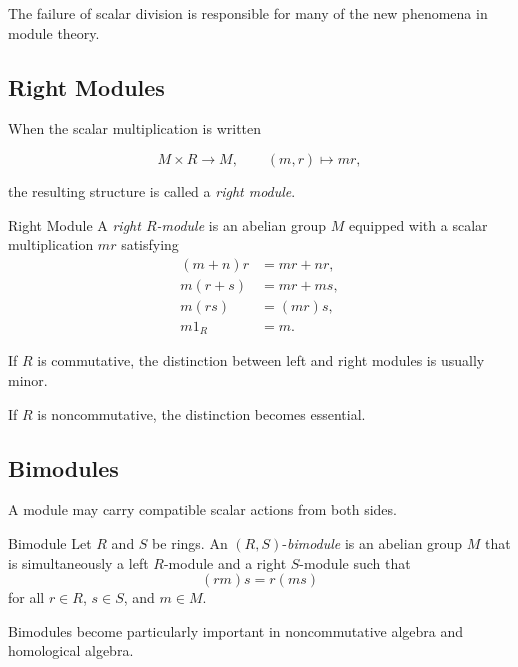 The failure of scalar division is responsible for many of the new phenomena
in module theory.

\subsection{Right Modules}
\label{subsec:right-modules}

When the scalar multiplication is written

\[ M\times R\to M,\qquad(m,r)\mapsto mr, \]

the resulting structure is called a \emph{right module}.

\begin{definitionbox}{Right Module}
A \emph{right \(R\)-module} is an abelian group \(M\) equipped with a scalar
multiplication \(mr\) satisfying
\[
\begin{aligned}
(m+n)r&=mr+nr,\\
m(r+s)&=mr+ms,\\
m(rs)&=(mr)s,\\
m1_R&=m.
\end{aligned}
\]
\end{definitionbox}

If \(R\) is commutative, the distinction between left and right modules is
usually minor.

If \(R\) is noncommutative, the distinction becomes essential.

\subsection{Bimodules}
\label{subsec:bimodules}

A module may carry compatible scalar actions from both sides.

\begin{definitionbox}{Bimodule}
Let \(R\) and \(S\) be rings. An \((R,S)\)-\emph{bimodule} is an abelian
group \(M\) that is simultaneously a left \(R\)-module and a right
\(S\)-module such that
\[ (rm)s=r(ms) \]
for all \(r\in R\), \(s\in S\), and \(m\in M\).
\end{definitionbox}

Bimodules become particularly important in noncommutative algebra and
homological algebra.

